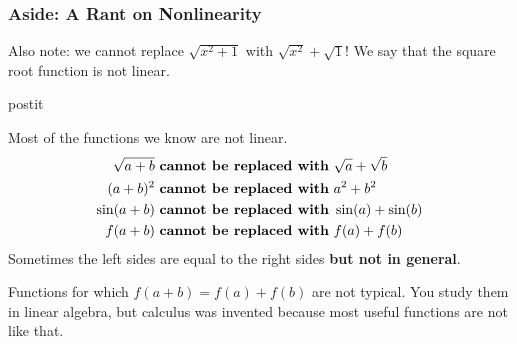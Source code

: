 \documentclass[serif,ignorenonframetext]{beamer}
\begin{document}
\begin{frame}
  \frametitle{Aside: A Rant on Nonlinearity}
  Also note: we cannot replace $\sqrt{x^2+1}$ with $\sqrt{x^2}+\sqrt{1}$!
  \pause
  We say that the square root function is not linear.
  \pause
  \begin{beamercolorbox}{postit}

  Most of the functions we know are not linear.
  \begin{align*}
    \sqrt{a+b} &\mbox{ \textbf{cannot be replaced with} } \sqrt{a} + \sqrt{b} \\
    (a+b)^2    &\mbox{ \textbf{cannot be replaced with} } a^2 + b^2           \\
    \sin(a+b)  &\mbox{ \textbf{cannot be replaced with} } \sin(a) + \sin(b)   \\
    f(a+b)     &\mbox{ \textbf{cannot be replaced with} } f(a) + f(b)
  \end{align*}
  \pause
  Sometimes the left sides are equal to the right sides \textbf{but not in
  general}.
  \end{beamercolorbox}
  \pause

  Functions for which $f(a+b)=f(a)+f(b)$ are not typical.  You study them
  in linear algebra, but calculus was invented because most useful functions
  are not like that.
\end{frame}
\end{document}

